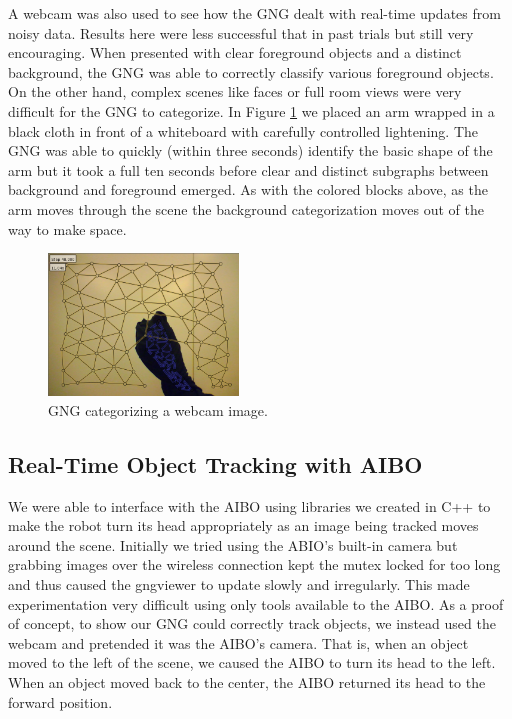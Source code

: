\documentclass{article}
\renewcommand{\|}{\origbar} %
\begin{document}
A webcam was also used to see how the GNG dealt with real-time updates from noisy data. Results here were less successful that in past trials but still very encouraging. When presented with clear foreground objects and a distinct background, the GNG was able to correctly classify various foreground objects. On the other hand, complex scenes like faces or full room views were very difficult for the GNG to categorize. In Figure \ref{fig:webcam} we placed an arm wrapped in a black cloth in front of a whiteboard with carefully controlled lightening. The GNG was able to quickly (within three seconds) identify the basic shape of the arm but it took a full ten seconds before clear and distinct subgraphs between background and foreground emerged. As with the colored blocks above, as the arm moves through the scene the background categorization moves out of the way to make space.

\begin{figure}[h!]
  \centering
  
  \includegraphics[width=0.45\textwidth]{webcam.png}
  
  \caption{GNG categorizing a webcam image.}
  \label{fig:webcam}
\end{figure}

\subsection{Real-Time Object Tracking with AIBO}

We were able to interface with the AIBO using libraries we created in C++ to make the robot turn its head appropriately as an image being tracked moves around the scene. Initially we tried using the ABIO's built-in camera but grabbing images over the wireless connection kept the mutex locked for too long and thus caused the gngviewer to update slowly and irregularly. This made experimentation very difficult using only tools available to the AIBO. As a proof of concept, to show our GNG could correctly track objects, we instead used the webcam and pretended it was the AIBO's camera. That is, when an object moved to the left of the scene, we caused the AIBO to turn its head to the left. When an object moved back to the center, the AIBO returned its head to the forward position.
\end{document}
